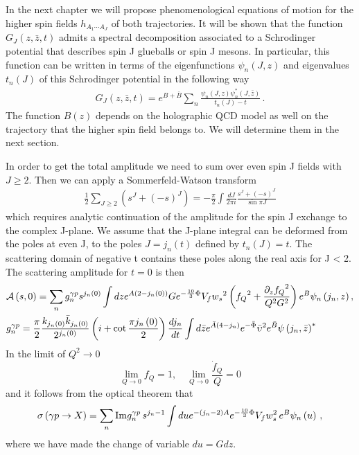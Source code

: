 \documentclass[a4paper,12pt]{article}
\begin{document}
In the next chapter we will propose phenomenological equations of motion for the higher spin fields $h_{A_1 \cdots A_J}$ of both trajectories. It will be shown that the function $G_J \left(z, \bar{z}, t\right)$ admits a spectral decomposition associated to a Schrodinger potential that describes spin J glueballs or spin J mesons. In particular, this function can be written in terms of the eigenfunctions $\psi_n\left(J, z\right)$ and eigenvalues $t_n\left(J\right)$ of this Schrodinger potential in the following way
\begin{align} 
G_J \left(z , \bar{z}, t \right) = e^{B + \bar{B}}  \sum_n \frac{\psi_n \left(J, z\right) \psi_n^* \left(J, \bar{z}\right)}{t_n\left(J\right) - t} \, .
\end{align}
The function $B(z)$ depends on the holographic QCD model as well on the trajectory that the higher spin field belongs to. We will determine them in the next section.

In order to get the total amplitude we need to sum over even spin J fields with $J \geq 2$. Then we can apply a Sommerfeld-Watson transform
\begin{align}
\frac{1}{2} \sum_{J \geq 2} \left(s^J + {\left(-s\right)}^J\right) = - \frac{\pi}{2} \int \frac{d J}{2 \pi i} \frac{s^J + \left(-s\right)^J}{\sin \pi J}
\end{align}
which requires analytic continuation of the amplitude for the spin J exchange to the complex J-plane. We assume that the J-plane integral can be deformed from the poles at even J, to the poles $J = j_n \left(t\right)$ defined by $t_n \left(J\right) = t$. The scattering domain of negative t contains these poles along the real axis for J < 2. The scattering amplitude for $t = 0$ is then
\begin{align}
&\mathcal{A} \left(s, 0 \right) = \sum_n g^{\gamma p}_n s^{j_n\left(0\right)} \int dz e^{A(2 - {j_n\left(0\right)})} G e^{-\frac{10}{3} \Phi}  V_f {w_s}^2  \left(  {f_Q}^2 + \frac{{\partial_z f_Q}^2}{Q^2 G^2}  \right) e^{B} \psi_n \left(j_n, z\right), \\
& g_n^{\gamma p} = \frac{\pi}{2} \frac{k_{j_n\left(0\right)} \bar{k}_{j_n\left(0\right)}}{2^{j_n\left(0\right)}}  \left(i + \cot \frac{\pi j_n\left(0\right)}{2} \right) \frac{d j_n}{dt} \int d\bar{z} e^{\bar{A}\left( 4 - j_n \right)} e^{-\bar{\Phi}}  {\bar{\upsilon}}^2 e^{\bar{B}}  {\psi\left(j_n, \bar{z}\right)}^{*} \notag
\end{align}
In the limit of $Q^2 \rightarrow 0$
\begin{equation}
\lim_{Q\rightarrow 0} f_Q = 1 , \quad \lim_{Q\rightarrow 0} \frac{\dot{f}_Q}{Q} = 0
\end{equation}
and it follows from the optical theorem that
\begin{equation}
\sigma\left(\gamma p \rightarrow X\right) = \sum_n {\rm Im} g^{\gamma p}_n \,  s^{j_n - 1} \int du e^{-\left(j_n - 2 \right)A } e^{-\frac{10}{3} \Phi} V_f w_s^2  \, e^B \psi_n\left(u\right) \, ,
\label{eq:sigma_gp_hol_gens}
\end{equation}
where we have made the change of variable $d u = G d z$.
\end{document}
